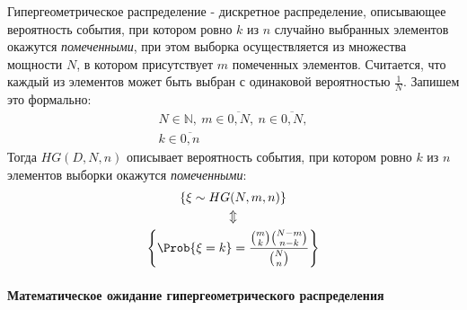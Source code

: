 Гипергеометрическое распределение - дискретное распределение,
описывающее вероятность события, при котором ровно \(k\) из \(n\)
случайно выбранных элементов окажутся \emph{помеченными}, при этом
выборка осуществляется из множества мощности \(N\), в котором
присутствует \(m\) помеченных элементов. Считается, что каждый из
элементов может быть выбран с одинаковой вероятностью \(\frac{1}{N}\).
Запишем это формально: \[\begin{gathered}
    N \in \mathbb{N},\ m \in \overline{0, N},\ n \in \overline{0, N},\\
    k \in \overline{0, n}
\end{gathered}\] Тогда \(HG(D, N, n)\) описывает вероятность события,
при котором ровно \(k\) из \(n\) элементов выборки окажутся
\emph{помеченными}: \[\begin{gathered}
    \left\{\xi \sim HG(N, m, n) \right\}\\
    \large\Updownarrow\\
    \left\{\Prob{\xi=k} = \frac{\binom{m}{k}\binom{N-m}{n-k}}{\binom{N}{n}}\right\}
\end{gathered}\]

\hypertarget{ux43cux430ux442ux435ux43cux430ux442ux438ux447ux435ux441ux43aux43eux435-ux43eux436ux438ux434ux430ux43dux438ux435-ux433ux438ux43fux435ux440ux433ux435ux43eux43cux435ux442ux440ux438ux447ux435ux441ux43aux43eux433ux43e-ux440ux430ux441ux43fux440ux435ux434ux435ux43bux435ux43dux438ux44f}{%
\paragraph{Математическое ожидание гипергеометрического
распределения}\label{ux43cux430ux442ux435ux43cux430ux442ux438ux447ux435ux441ux43aux43eux435-ux43eux436ux438ux434ux430ux43dux438ux435-ux433ux438ux43fux435ux440ux433ux435ux43eux43cux435ux442ux440ux438ux447ux435ux441ux43aux43eux433ux43e-ux440ux430ux441ux43fux440ux435ux434ux435ux43bux435ux43dux438ux44f}}

